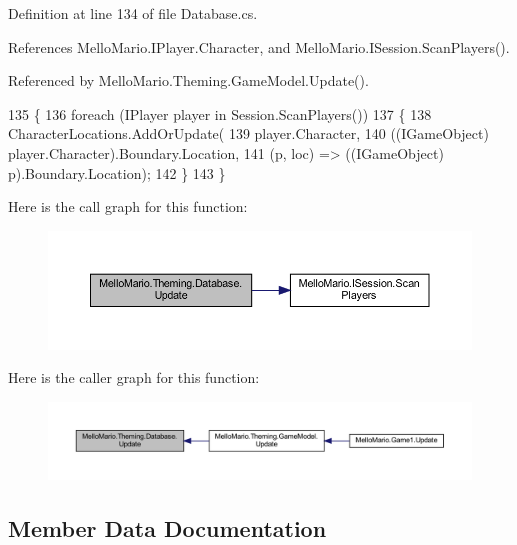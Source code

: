 Definition at line 134 of file Database.\+cs.



References Mello\+Mario.\+I\+Player.\+Character, and Mello\+Mario.\+I\+Session.\+Scan\+Players().



Referenced by Mello\+Mario.\+Theming.\+Game\+Model.\+Update().


\begin{DoxyCode}
135         \{
136             \textcolor{keywordflow}{foreach} (IPlayer player \textcolor{keywordflow}{in} Session.ScanPlayers())
137             \{
138                 CharacterLocations.AddOrUpdate(
139                     player.Character,
140                     ((IGameObject) player.Character).Boundary.Location,
141                     (p, loc) => ((IGameObject) p).Boundary.Location);
142             \}
143         \}
\end{DoxyCode}
Here is the call graph for this function\+:
\nopagebreak
\begin{figure}[H]
\begin{center}
\leavevmode
\includegraphics[width=350pt]{classMelloMario_1_1Theming_1_1Database_ab58c2296077881a98bc304b821cd0018_cgraph}
\end{center}
\end{figure}
Here is the caller graph for this function\+:
\nopagebreak
\begin{figure}[H]
\begin{center}
\leavevmode
\includegraphics[width=350pt]{classMelloMario_1_1Theming_1_1Database_ab58c2296077881a98bc304b821cd0018_icgraph}
\end{center}
\end{figure}


\subsection{Member Data Documentation}
\mbox{\label{classMelloMario_1_1Theming_1_1Database_a957885d0ec39aa9ba2adf4257eaf8754}} 
